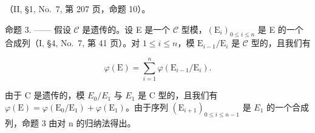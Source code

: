 （II, §1, No.~7, 第 207 页，命题 10）。

命题 3. —— 假设 \(\mathcal{C}\) 是遗传的。设 E 是一个 \(\mathcal{C}\) 型模，\((\mathrm{E}_i)_{0\leqslant i\leqslant n}\) 是 E 的一个合成列（I, §4, No.~7, 第 41 页）。对 \(1\leqslant i\leqslant n\)，模 \(\mathrm{E}_{i - 1} / \mathrm{E}_i\) 是 \(\mathcal{C}\) 型的，且我们有

\[
\varphi (\mathrm{E}) = \sum_ {i = 1} ^ {n} \varphi (\mathrm{E} _ {i - 1} / \mathrm{E} _ {i}).
\]

由于 C 是遗传的，模 \(E_{0}/E_{1}\) 与 \(E_{1}\) 是 C 型的，且我们有 \(\varphi(\mathrm{E}) = \varphi(\mathrm{E}_{0}/\mathrm{E}_{1}) + \varphi(\mathrm{E}_{1})\)。由于序列 \((\mathrm{E}_{i+1})_{0 \leqslant i \leqslant n-1}\) 是 \(E_{1}\) 的一个合成列，命题 3 由对 n 的归纳法得出。

